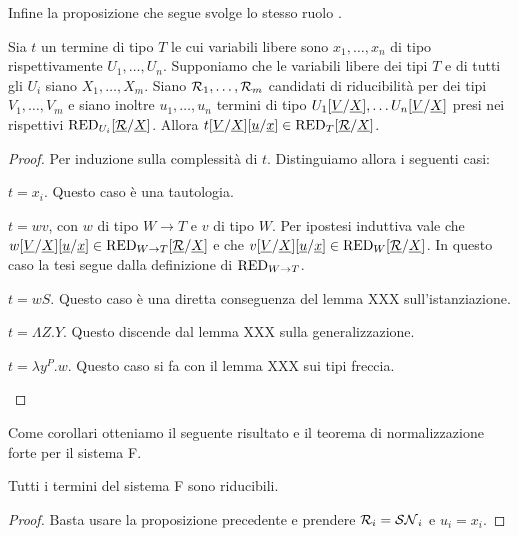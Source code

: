 \documentclass[]{marticle}
\begin{document}
Infine la proposizione che segue svolge lo stesso ruolo .
\begin{block} [Proposizione]
    Sia $t$ un termine di tipo $T$ le cui variabili libere sono $x_1, \dots,
    x_n$ di tipo rispettivamente $U_1, \dots, U_n$. Supponiamo che le variabili
    libere dei tipi $T$ e di tutti gli $U_i$ siano $X_1, \dots, X_m$. Siano
    $\mathcal{R}_1, \dots, \mathcal{R}_m$ candidati di riducibilit\`a per dei tipi $V_1,
    \dots, V_m$ e siano inoltre $u_1, \dots, u_n$ termini di tipo
    $U_1[\underline{V}/\underline{X}], \dots
    U_n[\underline{V}/\underline{X}]$ presi nei rispettivi
    $\text{RED}_{U_i}[\underline{\mathcal{R}}/\underline{X}]$. Allora $t[\underline{V}/\underline{X}]
    [\underline{u}/\underline{x}] \in \text{RED}_{T}[\underline{\mathcal{R}}/\underline{X}]$.
\newcommand{\subvx}{\sub{\underline{V}}{\underline{X}}}
\newcommand{\subut}{\sub{\underline{u}}{\underline{x}}}
\begin{proof}
    Per induzione sulla complessit\`a di $t$. Distinguiamo allora i seguenti
    casi:
    \begin{nlist}[i]
        \item $t=x_i$. Questo caso \`e una tautologia.
        \item $t=wv$, con $w$ di tipo $W\rightarrow T$ e $v$ di tipo $W$. Per
            ipostesi induttiva vale che $w\subvx\subut\in \red{W \rightarrow
            T}\subrx$ e che $v\subvx\subut \in \red{W}\subrx$. In questo caso la
            tesi segue dalla definizione di $\text{RED}_{W\rightarrow T}$.
        \item $t=wS$. Questo caso \`e una diretta conseguenza del lemma XXX
            sull'istanziazione. 
        \item $t=\Lambda Z. Y$. Questo discende dal lemma XXX sulla
            generalizzazione.
        \item $t=\lambda y^P.w$. Questo caso si fa con il lemma XXX sui tipi
            freccia.
    \end{nlist}
\end{proof}
\end{block}

Come corollari otteniamo il seguente risultato e il teorema di normalizzazione
forte per il sistema F.

\begin{block} [Proposizione]
    Tutti i termini del sistema F sono riducibili.
\begin{proof}
    Basta usare la proposizione precedente e prendere $\mathcal{R}_i=\mathcal{SN}_i$ e
    $u_i=x_i$.
\end{proof}
\end{block}
\end{document}
